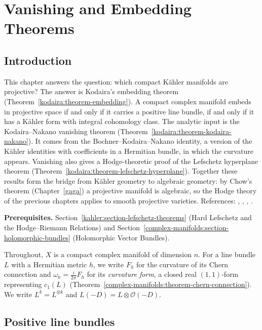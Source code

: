 \chapter{Vanishing and Embedding Theorems}\label{kodaira}

\section{Introduction}\label{kodaira:section-introduction}

This chapter answers the question: which compact K\"ahler manifolds are projective? The answer is Kodaira's embedding theorem
(Theorem~\ref{kodaira:theorem-embedding}). A compact complex manifold embeds in projective space if and only if it carries a positive line
bundle, if and only if it has a K\"ahler form with integral cohomology class. The analytic input is the Kodaira--Nakano vanishing theorem
(Theorem~\ref{kodaira:theorem-kodaira-nakano}). It comes from the Bochner--Kodaira--Nakano identity, a version of the K\"ahler identities
with coefficients in a Hermitian bundle, in which the curvature appears. Vanishing also gives a Hodge-theoretic proof of the Lefschetz
hyperplane theorem (Theorem~\ref{kodaira:theorem-lefschetz-hyperplane}). Together these results form the bridge from K\"ahler geometry to
algebraic geometry: by Chow's theorem (Chapter~\ref{gaga}) a projective manifold is algebraic, so the Hodge theory of the previous
chapters applies to smooth projective varieties. References: \cite[Chapter 1, Sections 2--4]{griffiths-harris}, \cite[Chapter 5]{huybrechts-complex},
\cite[Chapter 7]{voisin-hodge-1}, \cite{kodaira-1954}.

\noindent\textbf{Prerequisites.} Section~\ref{kahler:section-lefschetz-theorems} (Hard Lefschetz and the Hodge--Riemann Relations) and
Section~\ref{complex-manifolds:section-holomorphic-bundles} (Holomorphic Vector Bundles).

Throughout, $X$ is a compact complex manifold of dimension $n$. For a line bundle $L$ with a Hermitian metric $h$, we write $F_h$ for the
curvature of its Chern connection and $\omega_h = \frac{i}{2\pi}F_h$ for its \emph{curvature form}, a closed real $(1,1)$-form representing
$c_1(L)$ (Theorem~\ref{complex-manifolds:theorem-chern-connection}). We write $L^k = L^{\otimes k}$ and $L(-D) = L \otimes \mathcal{O}(-D)$.

\section{Positive line bundles}\label{kodaira:section-positive}

